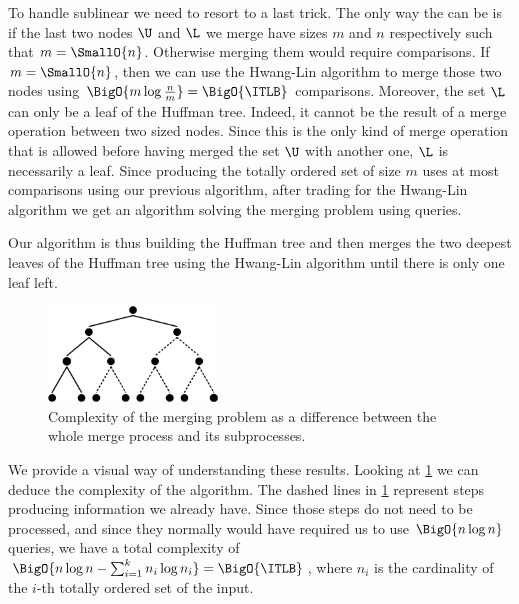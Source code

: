 To handle sublinear \ITLB we need to resort to a last trick. The only
way the \ITLB can be  is if the last two nodes \(\U\) and
\(\L\) we merge have sizes \(m\) and \(n\) respectively such that \(m =
\SmallO{n}\). Otherwise merging them would require  comparisons.
If \(m = \SmallO{n}\), then we can use the Hwang-Lin algorithm to merge those
two nodes using \(\BigO{m \log \frac{n}{m}} = \BigO{\ITLB}\) comparisons. Moreover, the set
\(\L\) can only be a leaf of the Huffman tree. Indeed, it cannot be the result
of a merge operation between two  sized nodes. Since this is the only
kind of merge operation that is allowed before having merged the set \(\U\)
with another one, \(\L\) is necessarily a leaf. Since producing the totally ordered
set of size \(m\) uses at most \BigO{\ITLB} comparisons using our
previous algorithm, after trading
\tapemerge for the Hwang-Lin algorithm we get an algorithm
solving the merging problem using \BigO{\ITLB} queries.

Our algorithm is thus building the Huffman tree and then merges the two deepest
leaves of the Huffman tree using the Hwang-Lin algorithm until there is only
one leaf left.

\begin{figure}
	\centering
	\includegraphics[width=0.4\textwidth]{fig/merging/huffman-2-trim}
	\caption{Complexity of the merging problem as a difference between the whole merge process and its subprocesses.}
	\label{tree:merging:fig/huffman-2}
\end{figure}

We provide a visual way of understanding these results. Looking at
\ref{tree:merging:fig/huffman-2} we can deduce the complexity of the algorithm.
The dashed lines in \ref{tree:merging:fig/huffman-2} represent steps producing
information we already have. Since those steps do not need to be processed, and
since they normally would have required us to use \(\BigO{n \log n}\) queries, we have a
total complexity of $\BigO{n \log n - \sum_{i=1}^{k} n_i \log n_i} =
\BigO{\ITLB}$, where $n_i$ is the cardinality of the $i$-th totally ordered set
of the input.
